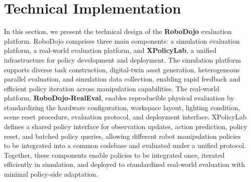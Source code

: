 \section{Technical Implementation}
\label{sec:method}

In this section, we present the technical design of the \textbf{RoboDojo} evaluation platform. RoboDojo comprises three main components: a simulation evaluation platform, a real-world evaluation platform, and \textbf{XPolicyLab}, a unified infrastructure for policy development and deployment. The simulation platform supports diverse task construction, digital-twin asset generation, heterogeneous parallel evaluation, and simulation data collection, enabling rapid feedback and efficient policy iteration across manipulation capabilities. The real-world platform, \textbf{RoboDojo-RealEval}, enables reproducible physical evaluation by standardizing the hardware configuration, workspace layout, lighting condition, scene reset procedure, evaluation protocol, and deployment interface. XPolicyLab defines a shared policy interface for observation updates, action prediction, policy reset, and batched policy queries, allowing different robot manipulation policies to be integrated into a common codebase and evaluated under a unified protocol. Together, these components enable policies to be integrated once, iterated efficiently in simulation, and deployed to standardized real-world evaluation with minimal policy-side adaptation.





